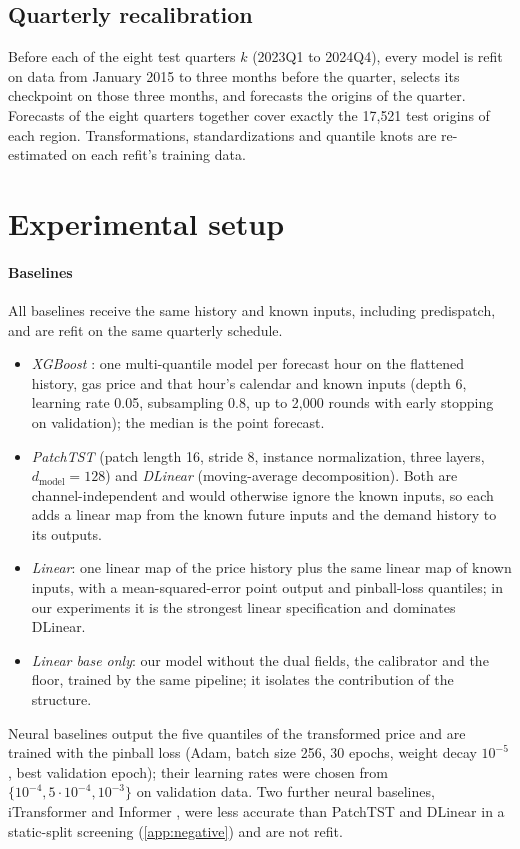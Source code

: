 \documentclass[preprint,12pt]{elsarticle}
\begin{document}
\subsection{Quarterly recalibration}
Before each of the eight test quarters $k$ (2023Q1 to 2024Q4), every model is refit on data from January 2015 to three months before the quarter, selects its checkpoint on those three months, and forecasts the origins of the quarter. Forecasts of the eight quarters together cover exactly the 17{,}521 test origins of each region. Transformations, standardizations and quantile knots are re-estimated on each refit's training data.

\section{Experimental setup}
\label{sec:setup}

\paragraph{Baselines} All baselines receive the same history and known inputs, including predispatch, and are refit on the same quarterly schedule.
\begin{itemize}
\item \emph{XGBoost} \citep{chen2016xgboost}: one multi-quantile model per forecast hour on the flattened history, gas price and that hour's calendar and known inputs (depth 6, learning rate 0.05, subsampling 0.8, up to 2{,}000 rounds with early stopping on validation); the median is the point forecast.
\item \emph{PatchTST} \citep{nie2023time} (patch length 16, stride 8, instance normalization, three layers, $d_{\mathrm{model}}=128$) and \emph{DLinear} \citep{zeng2023transformers} (moving-average decomposition). Both are channel-independent and would otherwise ignore the known inputs, so each adds a linear map from the known future inputs and the demand history to its outputs.
\item \emph{Linear}: one linear map of the price history plus the same linear map of known inputs, with a mean-squared-error point output and pinball-loss quantiles; in our experiments it is the strongest linear specification and dominates DLinear.
\item \emph{Linear base only}: our model without the dual fields, the calibrator and the floor, trained by the same pipeline; it isolates the contribution of the structure.
\end{itemize}
Neural baselines output the five quantiles of the transformed price and are trained with the pinball loss (Adam, batch size 256, 30 epochs, weight decay $10^{-5}$, best validation epoch); their learning rates were chosen from $\{10^{-4},5\cdot10^{-4},10^{-3}\}$ on validation data. Two further neural baselines, iTransformer \citep{liu2024itransformer} and Informer \citep{zhou2021informer}, were less accurate than PatchTST and DLinear in a static-split screening (\ref{app:negative}) and are not refit.
\end{document}
